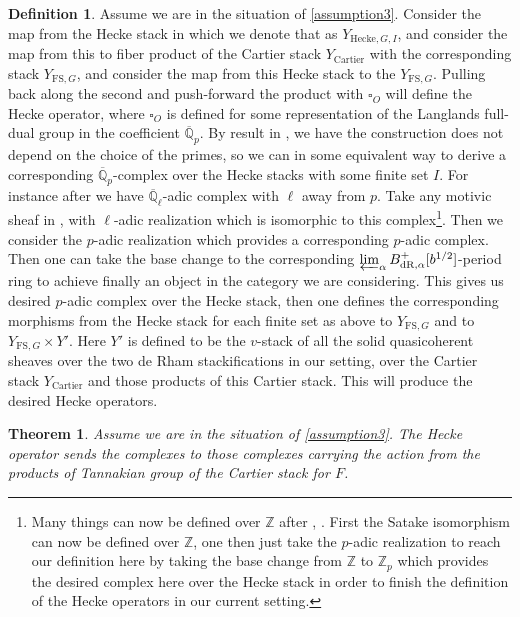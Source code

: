 \documentclass[12pt]{article}
\newtheorem{theorem}{Theorem}
\theoremstyle{definition}
\newtheorem{definition}{Definition}
\begin{document}
\begin{definition}
Assume we are in the situation of \cref{assumption3}. Consider the map from the Hecke stack in \cite{1FS} which we denote that as $Y_{\mathrm{Hecke},G,I}$, and consider the map from this to fiber product of the Cartier stack $Y_\mathrm{Cartier}$ with the corresponding stack $Y_{\mathrm{FS},G}$, and consider the map from this Hecke stack to the $Y_{\mathrm{FS},G}$. Pulling back along the second and push-forward the product with $\square_O$ will define the Hecke operator, where $\square_O$ is defined for some representation of the Langlands full-dual group in the coefficient $\overline{\mathbb{Q}}_p$. By result in \cite{1S5}, \cite{1S6} we have the construction does not depend on the choice of the primes, so we can in some equivalent way to derive a corresponding $\overline{\mathbb{Q}}_p$-complex over the Hecke stacks with some finite set $I$. For instance after \cite{1FS} we have $\overline{\mathbb{Q}}_\ell$-adic complex with $\ell$ away from $p$. Take any motivic sheaf in \cite{1S5}, \cite{1S6} with $\ell$-adic realization which is isomorphic to this complex\footnote{Many things can now be defined over $\mathbb{Z}$ after \cite{1S5}, \cite{1S6}. First the Satake isomorphism can now be defined over $\mathbb{Z}$, one then just take the $p$-adic realization to reach our definition here by taking the base change from $\mathbb{Z}$ to $\mathbb{Z}_p$ which provides the desired complex here over the Hecke stack in order to finish the definition of the Hecke operators in our current setting.}. Then we consider the $p$-adic realization which provides a corresponding $p$-adic complex. Then one can take the base change to the corresponding $\varprojlim_\alpha B^+_\mathrm{dR,\alpha}[b^{1/2}]$-period ring to achieve finally an object in the category we are considering. This gives us desired $p$-adic complex over the Hecke stack, then one defines the corresponding morphisms from the Hecke stack for each finite set as above to $Y_{\mathrm{FS},G}$ and to $Y_{\mathrm{FS},G}\times Y'$. Here $Y'$ is defined to be the $v$-stack of all the solid quasicoherent sheaves over the two de Rham stackifications in our setting, over the Cartier stack $Y_{\mathrm{Cartier}}$ and those products of this Cartier stack. This will produce the desired Hecke operators.
\end{definition}


\begin{theorem}
Assume we are in the situation of \cref{assumption3}. The Hecke operator sends the complexes to those complexes carrying the action from the products of Tannakian group of the Cartier stack for $F$.
\end{theorem}
\end{document}
